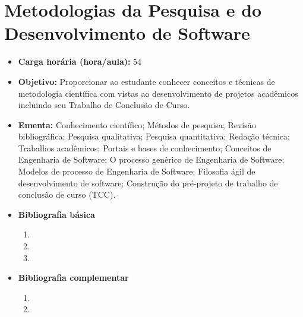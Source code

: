 \documentclass[
	10pt,				%
	openright,			%
	twoside,			%
	a4paper,			%
	english,			%
	french,				%
	brazil,				%
	sumario=tradicional
]{abntex2}
\begin{document}
\section*{Metodologias da Pesquisa e do Desenvolvimento de Software}\label{5_metodologia}
\begin{itemize}
	\item \textbf{Carga horária (hora/aula):} 54
	\item \textbf{Objetivo:} Proporcionar ao estudante conhecer conceitos e técnicas de metodologia científica com vistas ao desenvolvimento de projetos acadêmicos incluindo seu Trabalho de Conclusão de Curso.
	\item \textbf{Ementa:} 
	Conhecimento científico;
	Métodos de pesquisa; 
	Revisão bibliográfica;
	Pesquisa qualitativa;
	Pesquisa quantitativa; 
	Redação técnica;
	Trabalhos acadêmicos;
	Portais e bases de conhecimento;
	Conceitos de Engenharia de Software;
	O processo genérico de Engenharia de Software;
	Modelos de processo de Engenharia de Software;
	Filosofia ágil de desenvolvimento de software;
	Construção do pré-projeto de trabalho de conclusão de curso (TCC).
	\item \textbf{Bibliografia básica}
	\begin{enumerate}
		\item%
		\item%
		\item%
	\end{enumerate}
	\item \textbf{Bibliografia complementar}
	\begin{enumerate}
		\item%
		\item%
	\end{enumerate} 	
\end{itemize}


\newpage
\end{document}
